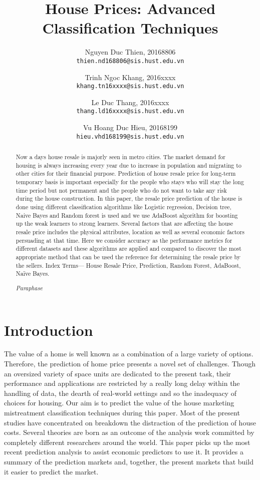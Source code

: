 \documentclass[12pt]{report}
\title{House Prices: Advanced Classification Techniques}
\author{
  Nguyen Duc Thien, 20168806\\
  \texttt{thien.nd168806@sis.hust.edu.vn}
  \and
  Trinh Ngoc Khang, 2016xxxx\\
  \texttt{khang.tn16xxxx@sis.hust.edu.vn}
  \and
  Le Duc Thang, 2016xxxx\\
  \texttt{thang.ld16xxxx@sis.hust.edu.vn}
  \and
  Vu Hoang Duc Hieu, 20168199\\
  \texttt{hieu.vhd168199@sis.hust.edu.vn}
}
\begin{document}
\begin{titlepage}
  \maketitle
\end{titlepage}

\begin{abstract}
  Now  a  days  house  resale  is  majorly  seen  in  metro  cities.
  The market demand for housing is always increasing every year due to  increase
  in  population  and  migrating  to  other  cities  for  their  financial  purpose.
  Prediction  of  house  resale  price  for  long-term  temporary  basis  is  important
  especially  for  the  people  who  stays    who will stay the long time period but not permanent
  and the people who  do  not  want  to  take  any  risk  during  the  house  construction.
  In    this  paper,  the  resale  price  prediction  of  the  house  is  done  using  different
  classification  algorithms  like  Logistic  regression,  Decision  tree,  Naive  Bayes  and
  Random  forest  is  used  and  we  use  AdaBoost  algorithm  for  boosting  up  the  weak  learners
  to  strong  learners.  Several factors  that are affecting the house resale price includes
  the physical  attributes,  location  as  well  as  several  economic  factors  persuading
  at   that   time.   Here   we   consider   accuracy   as   the   performance metrics for
  different datasets and these algorithms are applied and compared to discover the most appropriate
  method that can  be  used  the  reference  for  determining  the  resale  price  by  the  sellers.
  Index  Terms—  House  Resale  Price,  Prediction,  Random  Forest,    AdaBoost, Naïve Bayes.

  \emph{Paraphase}


\end{abstract}

\tableofcontents

\chapter{Introduction}
The value of a home is well known as a combination of a large variety  of  options.  
Therefore,  the  prediction  of  home  price  presents a novel set of challenges. 
Though an oversized variety of   space   units   are   dedicated   to   the   present   task,  
 their   performance  and  applications  are  restricted  by  a  really  long  delay  within  
 the  handling  of  data,  the  dearth  of  real-world  settings and so the inadequacy of 
 choices for housing. Our aim is  to  predict  the  value  of  the  house  marketing  mistreatment  
 classification techniques during this paper. Most of the present studies have concentrated on 
 breakdown the distraction of the prediction  of  house  costs.  Several  theories  are  born  
 as  an  outcome   of   the   analysis   work   committed   by   completely   different 
 researchers around the world. This paper picks up the most recent prediction analysis 
 to assist economic predictors to use  it.  It  provides  a  summary  of  the  prediction 
markets  and,  together,  the  present  markets  that  build  it  easier  to  predict  the  market.
\end{document}
